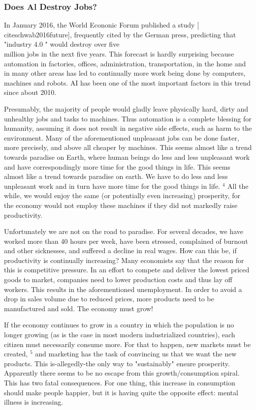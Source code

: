\documentclass[10pt]{book}
\begin{document}
\subsubsection*{Does Al Destroy Jobs?}
In January 2016, the World Econonic Forum published a study [\\cite{schwab2016future}], frequently cited by the German press, predicting that "industry 4.0 " would destroy over five\\

million jobs in the next five years. This forecast is hardly surprising because automation in factories, offices, administration, transportation, in the home and in many other areas has led to continually more work being done by computers, machines and robots. AI has been one of the most important factors in this trend since about 2010.

Presumably, the majority of people would gladly leave physically hard, dirty and unhealthy jobs and tasks to machines. Thus automation is a complete blessing for humanity, assuming it does not result in negative side effects, such as harm to the environment. Many of the aforementioned unpleasant jobs can be done faster, more precisely, and above all cheaper by machines. This seems almost like a trend towards paradise on Earth, where human beings do less and less unpleasant work and have correspondingly more time for the good things in life. This seems almost like a trend towards paradise on earth. We have to do less and less unpleasant work and in turn have more time for the good things in life. ${ }^{4}$ All the while, we would enjoy the same (or potentially even increasing) prosperity, for the economy would not employ these machines if they did not markedly raise productivity.

Unfortunately we are not on the road to paradise. For several decades, we have worked more than 40 hours per week, have been stressed, complained of burnout and other sicknesses, and suffered a decline in real wages. How can this be, if productivity is continually increasing? Many economists say that the reason for this is competitive pressure. In an effort to compete and deliver the lowest priced goods to market, companies need to lower production costs and thus lay off workers. This results in the aforementioned unemployment. In order to avoid a drop in sales volume due to reduced prices, more products need to be manufactured and sold. The economy must grow!

If the economy continues to grow in a country in which the population is no longer growing (as is the case in most modern industrialized countries), each citizen must necessarily consume more. For that to happen, new markets must be created, ${ }^{5}$ and marketing has the task of convincing us that we want the new products. This is-allegedly-the only way to "sustainably" ensure prosperity. Apparently there seems to be no escape from this growth/consumption spiral. This has two fatal consequences. For one thing, this increase in consumption should make people happier, but it is having quite the opposite effect: mental illness is increasing.
\end{document}
